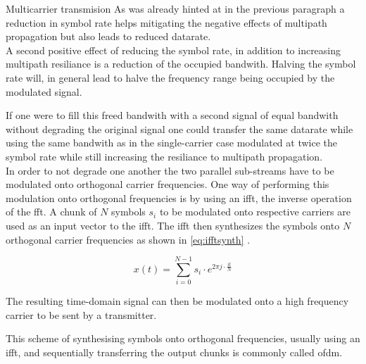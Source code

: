 \begin{subchapter}{Multicarrier transmision}
  As was already hinted at in the previous paragraph a reduction
  in symbol rate helps mitigating the negative effects of
  multipath propagation but also leads to reduced datarate. \\

  A second positive effect of reducing the symbol rate,
  in addition to increasing multipath resiliance is
  a reduction of the occupied bandwith.
  Halving the symbol rate will, in general lead to
  halve the frequency range being occupied by the
  modulated signal.

  If one were to fill this freed bandwith with a
  second signal of equal bandwith without
  degrading the original signal one could
  transfer the same datarate while using the
  same bandwith as in the single-carrier case
  modulated at twice the symbol rate
  while still increasing the resiliance to
  multipath propagation. \\

  In order to not degrade one another the two parallel
  sub-streams have to be modulated onto orthogonal
  carrier frequencies.
  One way of performing this modulation onto orthogonal
  frequencies is by using an \gls{ifft}, the inverse operation
  of the \acrlong{fft}.
  A chunk of $N$ symbols $s_{i}$ to be modulated onto respective carriers
  are used as an input vector to the \gls{ifft}.
  The \gls{ifft} then synthesizes the symbols onto $N$ orthogonal
  carrier frequencies as shown in \autoref{eq:ifftsynth} \cite{kammeyer2012}.

  \begin{equation}
    \label{eq:ifftsynth}
    x(t) = \sum_{i=0}^{N-1} s_{i} \cdot e ^ {2\pi j \cdot \frac{it}{N}}
  \end{equation}

  The resulting time-domain signal can then be modulated onto
  a high frequency carrier to be sent by a transmitter.

  This scheme of synthesising symbols onto orthogonal
  frequencies, usually using an \gls{ifft}, and sequentially
  transferring the output chunks is commonly called \gls{ofdm}.
\end{subchapter}

